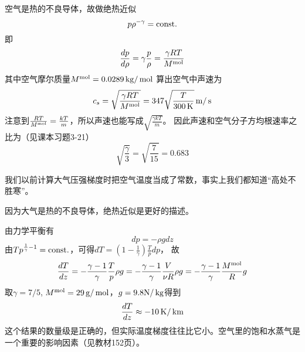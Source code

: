 \documentclass[CJK]{beamer}
\begin{document}
\begin{frame}
\bch
{\small
空气是热的不良导体，故做绝热近似 
$$p\rho^{-\gamma} = \mathrm{const.}$$
即 $$\frac{dp}{d\rho} = \gamma \frac{p}{\rho} =  \frac{\gamma R T}{M^{\rm mol}}$$
其中空气摩尔质量$M^{\rm mol} = 0.0289 \,\mathrm{kg}/\,\mathrm{mol}$
算出空气中声速为
$$c_s = \sqrt{\frac{\gamma RT}{M^{\rm mol}}} = 347 \sqrt{\frac{T}{300\,\mathrm{K}}} \,\mathrm{m}/\,\mathrm{s}$$
注意到$\frac{RT}{M^{\rm mol}} = \frac{kT}{m}$，所以声速也能写成$ \sqrt{\frac{\gamma kT}{m}}$。
因此声速和空气分子方均根速率之比为（见课本习题3-21）
$$\sqrt{\frac{\gamma}{3}} = \sqrt{\frac{7}{15}} = 0.683$$
}
\ech
\end{frame}

\begin{frame}
\bch
我们以前计算大气压强梯度时把空气温度当成了常数，事实上我们都知道“高处不胜寒”。


因为大气是热的不良导体，绝热近似是更好的描述。
\ech
\end{frame}

\begin{frame}
\bch
由力学平衡有
$$dp = -\rho g dz$$
由$Tp^{\frac{1}{\gamma}-1}= \mathrm{const.}$，可得$dT = \left(1-\frac{1}{\gamma}\right)\frac{T}{p} dp $，
故
$$\frac{dT}{dz} = -\frac{\gamma - 1}{\gamma} \frac{T}{p}\rho g= -\frac{\gamma - 1}{\gamma} \frac{V}{\nu R}\rho g =  -\frac{\gamma - 1}{\gamma} \frac{M^{\rm mol}}{ R} g$$
取$\gamma  = 7/5$, $M^{\rm mol} = 29\,\mathrm{g}/\,\mathrm{mol}$，$g = 9.8 \mathrm{N}/\,\mathrm{kg}$得到
$$\frac{dT}{dz} \approx -10\,\mathrm{K}/\,\mathrm{km}$$
这个结果的数量级是正确的，但实际温度梯度往往比它小。空气里的饱和水蒸气是一个重要的影响因素（见教材152页）。
\ech
\end{frame}
\end{document}
